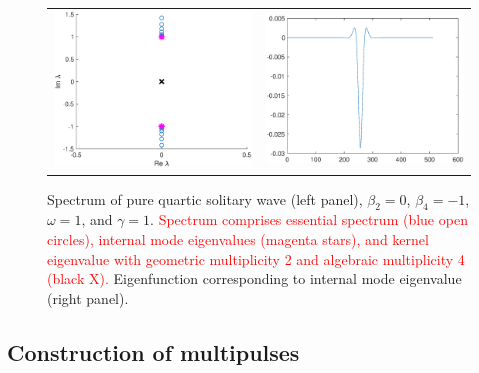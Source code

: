 \documentclass[12pt]{elsarticle}
\newcommand{\revised}[1]{ \textcolor{red}{#1} }
\begin{document}
\begin{figure}[H]
\centering
\begin{tabular}{cc}
\includegraphics[width=8cm]{images/PQSspec.eps} &
\includegraphics[width=8cm]{images/PQSinternalmode.eps}
\end{tabular}
\caption{Spectrum of pure quartic solitary wave (left panel), $\beta_2 = 0$, $\beta_4 = -1$, $\omega = 1$, and $\gamma = 1$. \revised{Spectrum comprises essential spectrum (blue open circles), internal mode eigenvalues (magenta stars), and kernel eigenvalue with geometric multiplicity 2 and algebraic multiplicity 4 (black X).} Eigenfunction corresponding to internal mode eigenvalue (right panel).}
\label{fig:PQSspec}
\end{figure} 

\subsection{Construction of multipulses}
\end{document}
